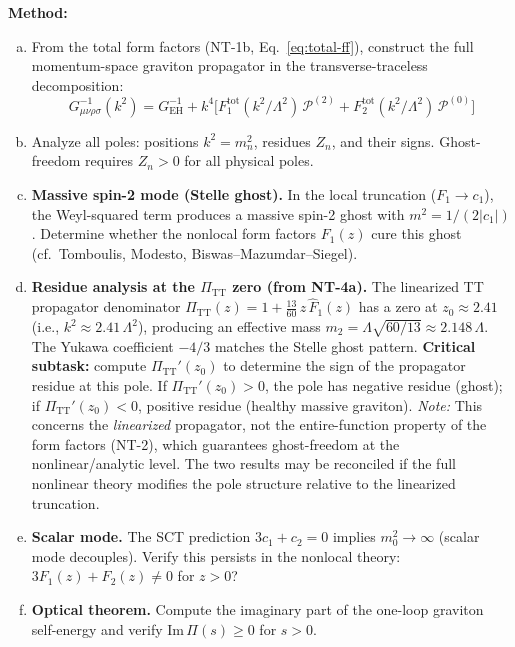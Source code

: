 \documentclass[12pt,a4paper]{article}
\newcommand{\method}[1]{\noindent\textbf{Method:} #1\par}
\begin{document}
\method{
\begin{enumerate}[(a)]
  \item From the total form factors (NT-1b, Eq.~\eqref{eq:total-ff}),
    construct the full momentum-space graviton propagator in the
    transverse-traceless decomposition:
    \begin{equation}\label{eq:propagator}
      G^{-1}_{\mu\nu\rho\sigma}(k^2) = G^{-1}_{\text{EH}}
      + k^4\bigl[F_1^{\text{tot}}(k^2/\Lambda^2)\,\mathcal{P}^{(2)}
      + F_2^{\text{tot}}(k^2/\Lambda^2)\,\mathcal{P}^{(0)}\bigr]
    \end{equation}
  \item Analyze all poles: positions $k^2 = m_n^2$, residues $Z_n$, and
    their signs. Ghost-freedom requires $Z_n > 0$ for all physical poles.
  \item \textbf{Massive spin-2 mode (Stelle ghost).} In the local truncation
    ($F_1 \to c_1$), the Weyl-squared term produces a massive spin-2 ghost
    with $m^2 = 1/(2|c_1|)$. Determine whether the nonlocal form factors
    $F_1(z)$ cure this ghost (cf.\ Tomboulis, Modesto, Biswas--Mazumdar--Siegel).
  \item \textbf{Residue analysis at the $\Pi_{\text{TT}}$ zero (from NT-4a).}
    The linearized TT propagator denominator $\Pi_{\text{TT}}(z) = 1 + \frac{13}{60}\,z\,\hat{F}_1(z)$
    has a zero at $z_0 \approx 2.41$ (i.e., $k^2 \approx 2.41\,\Lambda^2$),
    producing an effective mass $m_2 = \Lambda\sqrt{60/13} \approx 2.148\,\Lambda$.
    The Yukawa coefficient $-4/3$ matches the Stelle ghost pattern.
    \textbf{Critical subtask:} compute $\Pi_{\text{TT}}'(z_0)$ to determine the
    sign of the propagator residue at this pole.
    If $\Pi_{\text{TT}}'(z_0) > 0$, the pole has negative residue (ghost);
    if $\Pi_{\text{TT}}'(z_0) < 0$, positive residue (healthy massive graviton).
    \emph{Note:} This concerns the \emph{linearized} propagator, not the
    entire-function property of the form factors (NT-2), which guarantees
    ghost-freedom at the nonlinear/analytic level. The two results may be
    reconciled if the full nonlinear theory modifies the pole structure
    relative to the linearized truncation.
  \item \textbf{Scalar mode.} The SCT prediction $3c_1 + c_2 = 0$ implies
    $m_0^2 \to \infty$ (scalar mode decouples). Verify this persists in the
    nonlocal theory: $3F_1(z) + F_2(z) \neq 0$ for $z > 0$?
  \item \textbf{Optical theorem.} Compute the imaginary part of the one-loop
    graviton self-energy and verify $\text{Im}\,\Pi(s) \geq 0$ for $s > 0$.

\end{enumerate}}
\end{document}
